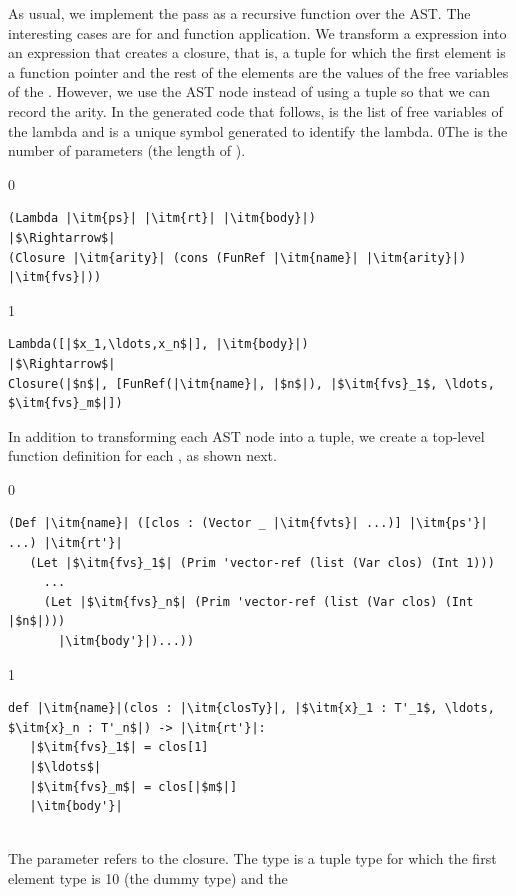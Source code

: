 \documentclass[7x10]{TimesAPriori_MIT}%
\def\racketEd{0}
\def\pythonEd{1}
\providecommand{\BookEdition}{1}
\let\edition\BookEdition
\newcommand{\racket}[1]{{\if\edition\racketEd{#1}\fi}}
\newcommand{\pythonColor}[0]{}
\newcommand{\python}[1]{{\if\edition\pythonEd\pythonColor #1\fi}}
\numberwithin{theorem}{chapter}
\numberwithin{definition}{chapter}
\numberwithin{equation}{chapter}
\begin{document}
As usual, we implement the pass as a recursive function over the
AST. The interesting cases are for  and function
application. We transform a  expression into an expression
that creates a closure, that is, a tuple for which the first element
is a function pointer and the rest of the elements are the values of
the free variables of the .
%
However, we use the  AST node instead of using a tuple
so that we can record the arity.
%
In the generated code that follows,  is the list of free
variables of the lambda and  is a unique symbol generated to
identify the lambda.
%
\racket{The  is the number of parameters (the length of
  \itm{ps}).}
%
{\if\edition\racketEd
\begin{lstlisting}
(Lambda |\itm{ps}| |\itm{rt}| |\itm{body}|)
|$\Rightarrow$|
(Closure |\itm{arity}| (cons (FunRef |\itm{name}| |\itm{arity}|) |\itm{fvs}|))
\end{lstlisting}
\fi}
%
{\if\edition\pythonEd\pythonColor
\begin{lstlisting}
Lambda([|$x_1,\ldots,x_n$|], |\itm{body}|)
|$\Rightarrow$|
Closure(|$n$|, [FunRef(|\itm{name}|, |$n$|), |$\itm{fvs}_1$, \ldots, $\itm{fvs}_m$|])
\end{lstlisting}
\fi}
%
In addition to transforming each  AST node into a
tuple, we create a top-level function definition for each
, as shown next.\\
\begin{minipage}{0.8\textwidth}
{\if\edition\racketEd
\begin{lstlisting}
(Def |\itm{name}| ([clos : (Vector _ |\itm{fvts}| ...)] |\itm{ps'}| ...) |\itm{rt'}|
   (Let |$\itm{fvs}_1$| (Prim 'vector-ref (list (Var clos) (Int 1)))
     ...
     (Let |$\itm{fvs}_n$| (Prim 'vector-ref (list (Var clos) (Int |$n$|)))
       |\itm{body'}|)...))
\end{lstlisting}
\fi}
{\if\edition\pythonEd\pythonColor
\begin{lstlisting}
def |\itm{name}|(clos : |\itm{closTy}|, |$\itm{x}_1 : T'_1$, \ldots, $\itm{x}_n : T'_n$|) -> |\itm{rt'}|:
   |$\itm{fvs}_1$| = clos[1]
   |$\ldots$|
   |$\itm{fvs}_m$| = clos[|$m$|]
   |\itm{body'}|
\end{lstlisting}
\fi}
\end{minipage}\\
%
The  parameter refers to the closure.  The type
 is a tuple type for which the first element type is
\python{}\racket{\code{\_} (the dummy type)} and the
\end{document}
